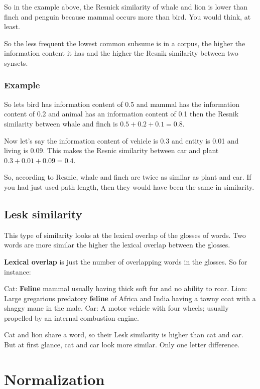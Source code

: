 \documentclass[
  11pt,
  british,
]{article}
\begin{document}
So in the example above, the Resnick similarity of whale and lion is
lower than finch and penguin because mammal occurs more than bird. You
would think, at least.

So the less frequent the lowest common subsume is in a corpus, the
higher the information content it has and the higher the Resnik
similarity between two synsets.

\hypertarget{example}{%
\subsubsection{Example}\label{example}}

So lets bird has information content of 0.5 and mammal has the
information content of 0.2 and animal has an information content of 0.1
then the Resnik similarity between whale and finch is
\(0.5 + 0.2 + 0.1 = 0.8\).

Now let's say the information content of vehicle is 0.3 and entity is
0.01 and living is 0.09. This makes the Resnic similarity between car
and plant \(0.3 + 0.01 + 0.09 = 0.4\).

So, according to Resnic, whale and finch are twice as similar as plant
and car. If you had just used path length, then they would have been the
same in similarity.

\hypertarget{lesk-similarity}{%
\subsection{Lesk similarity}\label{lesk-similarity}}

This type of similarity looks at the lexical overlap of the glosses of
words. Two words are more similar the higher the lexical overlap between
the glosses.

\textbf{Lexical overlap} is just the number of overlapping words in the
glosses. So for instance:

Cat: \textbf{Feline} mammal usually having thick soft fur and no ability
to roar. Lion: Large gregarious predatory \textbf{feline} of Africa and
India having a tawny coat with a shaggy mane in the male. Car: A motor
vehicle with four wheels; usually propelled by an internal combustion
engine.

Cat and lion share a word, so their Lesk similarity is higher than cat
and car. But at first glance, cat and car look more similar. Only one
letter difference.

\hypertarget{normalization}{%
\section{Normalization}\label{normalization}}
\end{document}

